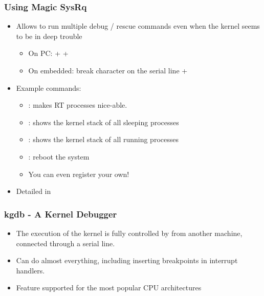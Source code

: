 \begin{frame}
  \frametitle{Using Magic SysRq}
  \begin{itemize}
  \item Allows to run multiple debug / rescue commands even when the
    kernel seems to be in deep trouble
    \begin{itemize}
    \item On PC: \code{[Alt]} + \code{[SysRq]} + 
    \item On embedded: break character on the serial line +
    \end{itemize}
  \item Example commands:
    \begin{itemize}
    \item {}: makes RT processes nice-able.
    \item {}: shows the kernel stack of all sleeping processes
    \item {}: shows the kernel stack of all running processes
    \item {}: reboot the system
    \item You can even register your own!
    \end{itemize}
  \item Detailed in 
  \end{itemize}
\end{frame}

\begin{frame}
  \frametitle{kgdb - A Kernel Debugger}
  \begin{itemize}
  \item The execution of the kernel is fully controlled by 
    from another machine, connected through a serial line.
  \item Can do almost everything, including inserting breakpoints in
    interrupt handlers.
  \item Feature supported for the most popular CPU architectures
  \end{itemize}
\end{frame}

